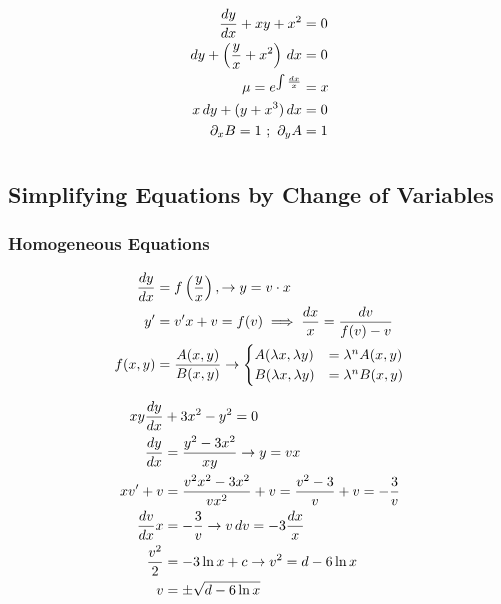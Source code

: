 \documentclass[Maths.tex]{subfiles}
\begin{document}
\begin{example}
    \begin{align*}
        \frac{dy}{dx} + xy + x^2 &= 0 \\
        dy + \left(\frac{y}{x} + x^2\right)\,dx &= 0 \\
        \mu = e^{\int \frac{dx}{x}} &= x \\
        x\,dy + (y + x^3)\,dx &= 0 \\
        \partial_xB = 1 ~;~ \partial_yA &= 1
    \end{align*}
\end{example}

\chapter{}

\section{Simplifying Equations by Change of Variables}
\subsection{Homogeneous Equations}
\begin{align*}
    \frac{dy}{dx} &= f\left(\frac{y}{x}\right), \to y = v\cdot x \\
    y' &= v'x + v = f(v) \implies \frac{dx}{x} = \frac{dv}{f(v) - v} \\
    f(x, y) &= \frac{A(x,y)}{B(x,y)} \to \begin{cases} A(\lambda x, \lambda y) &= \lambda^{n}A(x,y) \\
    B(\lambda x, \lambda y) &= \lambda^n B(x,y) \end{cases}
\end{align*}

\begin{example}
\begin{align*}
    xy\frac{dy}{dx} &+ 3x^2 - y^2 = 0 \\
    \frac{dy}{dx} &= \frac{y^2 - 3x^2}{xy} \to y = vx \\
    xv' + v &= \frac{v^2x^2 - 3x^2}{vx^2} + v = \frac{v^2 - 3}{v} + v = -\frac{3}{v} \\
    \frac{dv}{dx}x &= -\frac{3}{v} \to v\,dv = -3\frac{dx}{x} \\
    \frac{v^2}{2} &= -3\ln{x} + c \to v^2 = d - 6\ln{x} \\
    v &= \pm \sqrt{d - 6\ln{x}}
\end{align*}
\end{example}
\end{document}
